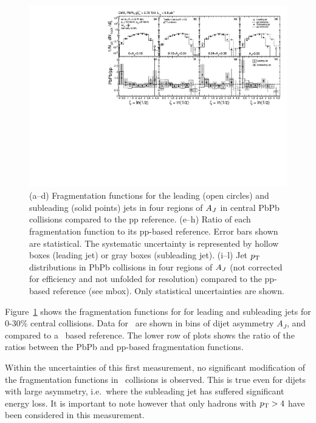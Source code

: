 \begin{figure}[!h]
\begin{center}
\includegraphics[width=0.98\mboxwidth]{jetfigures/xsi_div_both_effv9_l100s40_0to12_dphi20eta20dr3pt4id1_cwt_ppDiv_gray.pdf}
\caption{(a--d) Fragmentation functions for the leading (open circles) and subleading (solid points) jets in four regions of $A_J$ in central PbPb collisions compared to the pp reference.
(e--h) Ratio of each fragmentation function to its
pp-based reference.
Error bars shown are statistical. The systematic uncertainty is
represented by hollow boxes (leading jet) or gray boxes (subleading jet).
(i--l) Jet $p_{\rm{T}}$ distributions in PbPb collisions in four regions of $A_J$ (not corrected for efficiency and not unfolded for \pt resolution)
compared to the
pp-based reference
(see mbox). Only statistical uncertainties are shown.
}

\label{fig:GR:CMS_jetFF}
\end{center}
\end{figure}
Figure~\ref{fig:GR:CMS_jetFF} shows the fragmentation functions for
for leading and subleading jets for 0-30\% central collisions. Data for \PbPb\ are shown in 
bins of dijet asymmetry $A_J$, and compared to a \pp\ based reference.
The lower row of plots shows the ratio of the ratios between the PbPb 
and pp-based fragmentation functions.

Within the uncertainties of this first measurement, no significant modification of 
the fragmentation functions in \PbPb\ collisions is observed. This is true even for 
dijets with large asymmetry, i.e.\ where the subleading jet has suffered significant
energy loss. It is important to note however that only hadrons with $p_{\rm{T}} > 4$\GeVc
have been considered in this measurement.

